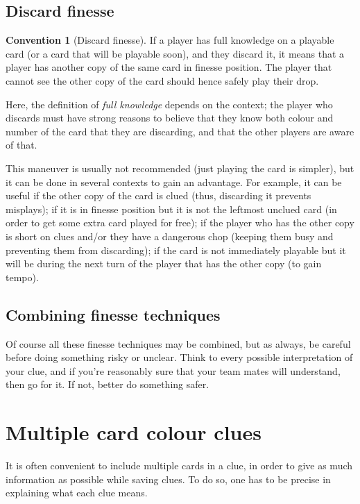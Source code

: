 \documentclass[a4paper]{article}
\theoremstyle{plain}
\theoremstyle{definition}
\newtheorem{convention}[theorem]{Convention}
\begin{document}
\subsection{Discard finesse}

\begin{convention}[Discard finesse]
	If a player has full knowledge on a playable card (or a card that will be playable soon), and they discard it, it means that a player has another copy of the same card in finesse position. The player that cannot see the other copy of the card should hence safely play their drop.
\end{convention}

Here, the definition of \emph{full knowledge} depends on the context; the player who discards must have strong reasons to believe that they know both colour and number of the card that they are discarding, and that the other players are aware of that.

This maneuver is usually not recommended (just playing the card is simpler), but it can be done in several contexts to gain an advantage. For example, it can be useful if the other copy of the card is clued (thus, discarding it prevents misplays); if it is in finesse position but it is not the leftmost unclued card (in order to get some extra card played for free); if the player who has the other copy is short on clues and/or they have a dangerous chop (keeping them busy and preventing them from discarding); if the card is not immediately playable but it will be during the next turn of the player that has the other copy (to gain tempo).

\subsection{Combining finesse techniques}

Of course all these finesse techniques may be combined, but as always, be careful before doing something risky or unclear. Think to every possible interpretation of your clue, and if you're reasonably sure that your team mates will understand, then go for it. If not, better do something safer.

\section{Multiple card colour clues}

It is often convenient to include multiple cards in a clue, in order to give as much information as possible while saving clues. To do so, one has to be precise in explaining what each clue means.
\end{document}
